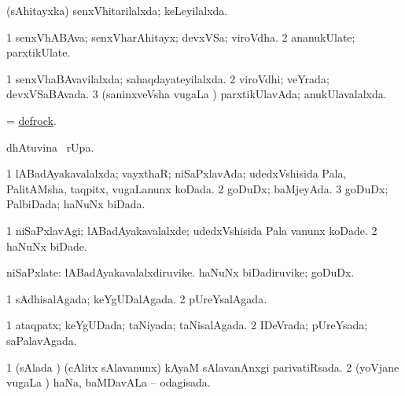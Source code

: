 \bentry
{} 
\gl{\gu}
\expl{}
\bmng
 (sAhitayxka) senxVhitarilalxda; keLeyilalxda. 
\emng
\eentry

\bentry
{} 
\gl{\nA}
\expl{}
\bmng
\bnum
\num{1} senxVhABAva; senxVharAhitayx; devxVSa; viroVdha. 
\num{2} ananukUlate; parxtikUlate. 
\enum
\emng
\eentry

\bentry
{} 
\gl{\gu}
\bmng
\bnum
\num{1} senxVhaBAvavilalxda; sahaqdayateyilalxda. 
\num{2} viroVdhi; veYrada; devxVSaBAvada. 
\num{3} (saninxveVsha \mo vugaLa \vi) parxtikUlavAda; anukUlavalalxda. 
\enum
\emng
\eentry

\bentry
{} 
\gl{\sakirx}
\expl{}
\bmng
 = \hyperref{kandict_d.pdf}{D}{defrock}{defrock}. 
\emng
\eentry

\bentry
{} 
\gl{\kirx}
\expl{}
\bmng
  dhAtuvina \BUkaq\ rUpa. 
\emng
\eentry

\bentry
{} 
\gl{\kirx}
\expl{}
\bmng
\emng
\eentry

\bentry
{} 
\gl{\gu}
\expl{}
\bmng
\bnum
\num{1} lABadAyakavalalxda; vayxthaR; niSaPxlavAda; udedxVshisida Pala, PalitAMsha, taqpitx, \mo vugaLanunx koDada. 
\num{2} goDuDx; baMjeyAda. 
\num{3} goDuDx; PalbiDada; haNuNx biDada. 
\enum
\emng
\eentry

\bentry
{} 
\gl{\kirxvi}
\expl{}
\bmng
\bnum
\num{1} niSaPxlavAgi; lABadAyakavalalxde; udedxVshisida Pala \mo vanunx koDade. 
\num{2} haNuNx biDade. 
\enum
\emng
\eentry

\bentry
{} 
\gl{\nA}
\expl{}
\bmng
 niSaPxlate: 
\banum
{} lABadAyakavalalxdiruvike. 
 haNuNx biDadiruvike; goDuDx. 
\eanum
\emng
\eentry

\bentry
{} 
\gl{\gu} 
\bmng
\bnum
\num{1} sAdhisalAgada; keYgUDalAgada. 
\num{2} pUreYsalAgada. 
\enum
\emng
\eentry

\bentry
{} 
\gl{\gu}
\bmng
\bnum
\num{1} ataqpatx; keYgUDada; taNiyada; taNisalAgada. 
\num{2} IDeVrada; pUreYsada; saPalavAgada. 
\enum
\emng
\eentry

\bentry
{} 
\gl{\gu}
\expl{}
\bmng
\bnum
\num{1} (sAlada \vi) (cAlitx sAlavanunx) kAyaM sAlavanAnxgi parivatiRsada. 
\num{2} (yoVjane \mo vugaLa \vi) haNa, baMDavALa -- odagisada. 
\enum
\emng
\eentry

